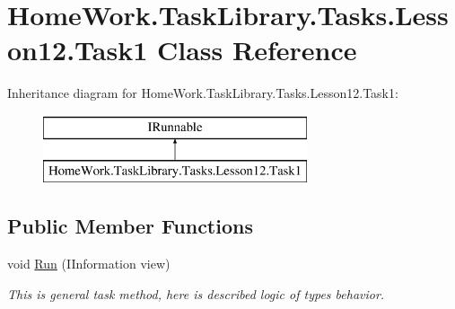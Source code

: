 \hypertarget{class_home_work_1_1_task_library_1_1_tasks_1_1_lesson12_1_1_task1}{}\section{Home\+Work.\+Task\+Library.\+Tasks.\+Lesson12.\+Task1 Class Reference}
\label{class_home_work_1_1_task_library_1_1_tasks_1_1_lesson12_1_1_task1}
Inheritance diagram for Home\+Work.\+Task\+Library.\+Tasks.\+Lesson12.\+Task1\+:\begin{figure}[H]
\begin{center}
\leavevmode
\includegraphics[height=2.000000cm]{class_home_work_1_1_task_library_1_1_tasks_1_1_lesson12_1_1_task1}
\end{center}
\end{figure}
\subsection*{Public Member Functions}
\begin{DoxyCompactItemize}
\item 
void \mbox{\hyperlink{class_home_work_1_1_task_library_1_1_tasks_1_1_lesson12_1_1_task1_a9339a2bf78919df20e2732ee3ff177e8}{Run}} (I\+Information view)
\begin{DoxyCompactList}\small\item\em This is general task method, here is described logic of types behavior. \end{DoxyCompactList}\end{DoxyCompactItemize}
